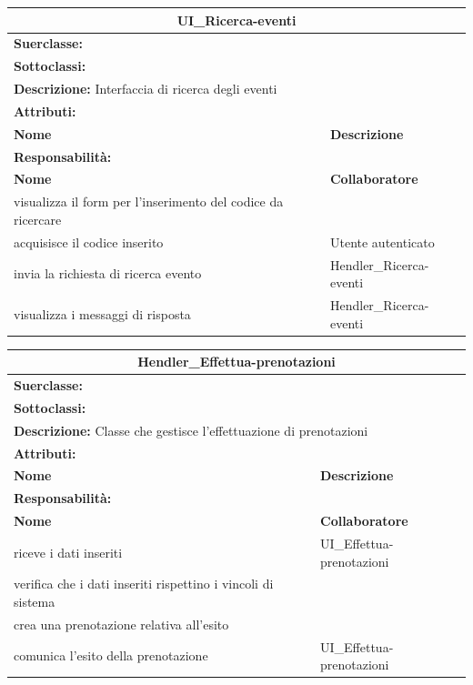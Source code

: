 \documentclass[11pt]{article}
\begin{document}
\begin{table}[H]
\centering
\begin{tabularx}{1\textwidth}{|X|X|}\hline
\multicolumn{2}{|c|}{\textbf{UI\_Ricerca-eventi}}\\\hline
\multicolumn{2}{|l|}{\textbf{Suerclasse:}}\\\hline
\multicolumn{2}{|l|}{\textbf{Sottoclassi:}}\\\hline
\multicolumn{2}{|l|}{\textbf{Descrizione:} Interfaccia di ricerca degli eventi}\\\hline
\multicolumn{2}{|l|}{\textbf{Attributi:}}\\
\textbf{Nome} & \textbf{Descrizione}\\
\hline
\multicolumn{2}{|l|}{\textbf{Responsabilità:}}\\
\textbf{Nome} & \textbf{Collaboratore}\\
visualizza il form per l'inserimento del codice da ricercare &\\
acquisisce il codice inserito & Utente autenticato\\
invia la richiesta di ricerca evento & Hendler\_Ricerca-eventi\\
visualizza i messaggi di risposta & Hendler\_Ricerca-eventi\\
\hline
\end{tabularx}
\end{table}


\begin{table}[H]
\centering
\begin{tabularx}{1\textwidth}{|X|X|}\hline
\multicolumn{2}{|c|}{\textbf{Hendler\_Effettua-prenotazioni}}\\\hline
\multicolumn{2}{|l|}{\textbf{Suerclasse:}}\\\hline
\multicolumn{2}{|l|}{\textbf{Sottoclassi:}}\\\hline
\multicolumn{2}{|l|}{\textbf{Descrizione:} Classe che gestisce l'effettuazione di prenotazioni}\\\hline
\multicolumn{2}{|l|}{\textbf{Attributi:}}\\
\textbf{Nome} & \textbf{Descrizione}\\
\hline
\multicolumn{2}{|l|}{\textbf{Responsabilità:}}\\
\textbf{Nome} & \textbf{Collaboratore}\\
riceve i dati inseriti & UI\_Effettua-prenotazioni\\
verifica che i dati inseriti rispettino i vincoli di sistema &\\
crea una prenotazione relativa all'esito &\\
comunica l'esito della prenotazione & UI\_Effettua-prenotazioni\\
\hline
\end{tabularx}
\end{table}
\end{document}
